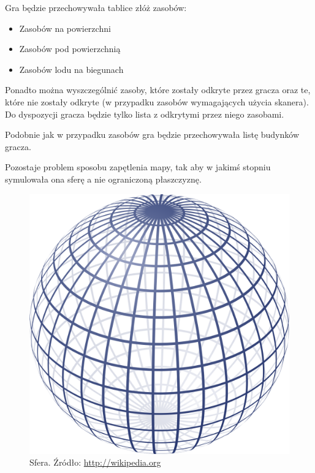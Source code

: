 \documentclass[a4paper,12pt]{article}
\begin{document}
Gra będzie przechowywała tablice złóż zasobów:
\begin{itemize}
	\item Zasobów na powierzchni
	\item Zasobów pod powierzchnią
	\item Zasobów lodu na biegunach
\end{itemize}

Ponadto można wyszczególnić zasoby, które zostały odkryte przez gracza oraz te, które nie zostały odkryte (w przypadku zasobów wymagających użycia skanera). Do dyspozycji gracza będzie tylko lista z odkrytymi przez niego zasobami.

Podobnie jak w przypadku zasobów gra będzie przechowywała listę budynków gracza.

Pozostaje problem sposobu zapętlenia mapy, tak aby w jakimś stopniu symulowała ona sferę a nie ograniczoną płaszczyznę. 

\begin{figure}[h]
	\centering
	\includegraphics[scale=0.1]{sphere}
	\caption{Sfera. Źródło: \url{http://wikipedia.org}}
\end{figure}
\end{document}
